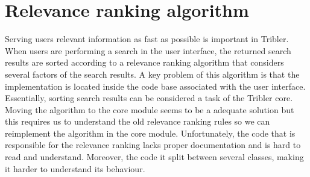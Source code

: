 \section{Relevance ranking algorithm}
\label{sec:relevance-ranking-algorithm}
Serving users relevant information as fast as possible is important in Tribler. When users are performing a search in the user interface, the returned search results are sorted according to a relevance ranking algorithm that considers several factors of the search results. A key problem of this algorithm is that the implementation is located inside the code base associated with the user interface. Essentially, sorting search results can be considered a task of the Tribler core. Moving the algorithm to the core module seems to be a adequate solution but this requires us to understand the old relevance ranking rules so we can reimplement the algorithm in the core module. Unfortunately, the code that is responsible for the relevance ranking lacks proper documentation and is hard to read and understand. Moreover, the code it split between several classes, making it harder to understand its behaviour.

